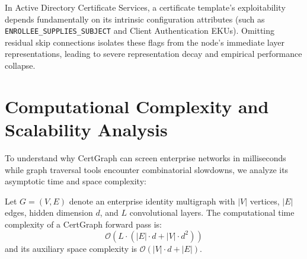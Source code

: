 \begin{corollary}
In Active Directory Certificate Services, a certificate template's exploitability depends fundamentally on its intrinsic configuration attributes (such as \texttt{ENROLLEE\_SUPPLIES\_SUBJECT} and Client Authentication EKUs). Omitting residual skip connections isolates these flags from the node's immediate layer representations, leading to severe representation decay and empirical performance collapse.
\end{corollary}

\section{Computational Complexity and Scalability Analysis}
To understand why CertGraph can screen enterprise networks in milliseconds while graph traversal tools encounter combinatorial slowdowns, we analyze its asymptotic time and space complexity:

\begin{proposition}
Let $G = (V, E)$ denote an enterprise identity multigraph with $|V|$ vertices, $|E|$ edges, hidden dimension $d$, and $L$ convolutional layers. The computational time complexity of a CertGraph forward pass is:
\begin{equation}
\mathcal{O} \left( L \cdot \left( |E| \cdot d + |V| \cdot d^2 \right) \right)
\end{equation}
and its auxiliary space complexity is $\mathcal{O}(|V| \cdot d + |E|)$.
\end{proposition}

